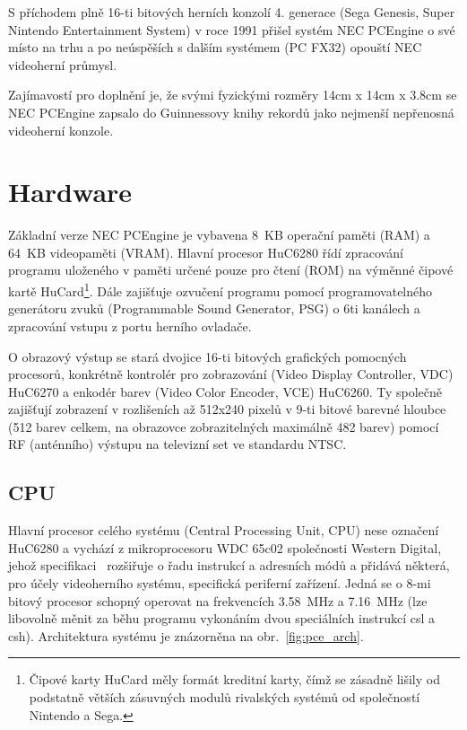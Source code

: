 S příchodem plně 16-ti bitových herních konzolí 4. generace (Sega Genesis,
Super Nintendo Entertainment System) v roce 1991 přišel systém NEC PCEngine o
své místo na trhu a po neúspěších s dalším systémem (PC FX32) opouští NEC
videoherní průmysl.~\cite{wwwWikiTurboGrafx}

Zajímavostí pro doplnění je, že svými fyzickými rozměry 14cm x 14cm x 3.8cm se
NEC PCEngine zapsalo do Guinnessovy knihy rekordů jako nejmenší nepřenosná
videoherní konzole.~\cite{Guinness08}


\section{Hardware}\label{chap:spec_hw}

Základní verze NEC PCEngine je vybavena 8~KB operační paměti (RAM) a 64~KB
videopaměti (VRAM). Hlavní procesor HuC6280 řídí zpracování programu uloženého
v paměti určené pouze pro čtení (ROM) na výměnné čipové kartě
HuCard\footnote{Čipové karty HuCard měly formát kreditní karty, čímž se zásadně
lišily od podstatně větších zásuvných modulů rivalských systémů od společností
Nintendo a Sega.}. Dále zajišťuje ozvučení programu pomocí programovatelného
generátoru zvuků (Programmable Sound Generator, PSG) o 6ti kanálech a
zpracování vstupu z portu herního ovladače.

O obrazový výstup se stará dvojice 16-ti bitových grafických pomocných
procesorů, konkrétně kontrolér pro zobrazování (Video Display Controller, VDC)
HuC6270 a enkodér barev (Video Color Encoder, VCE) HuC6260. Ty společně
zajišťují zobrazení v rozlišeních až 512x240 pixelů v 9-ti bitové barevné
hloubce (512 barev celkem, na obrazovce zobrazitelných maximálně 482 barev)
pomocí RF (anténního) výstupu na televizní set ve standardu NTSC.~\cite{wwwWikiTurboGrafx}

%
%

\subsection{CPU}\label{chap:spec_hw_cpu}

Hlavní procesor celého systému (Central Processing Unit, CPU) nese označení
HuC6280 a vychází z mikroprocesoru WDC 65c02 společnosti Western Digital, jehož
specifikaci~\cite{www65c02} rozšiřuje o řadu instrukcí a adresních módů a
přidává některá, pro účely videoherního systému, specifická periferní zařízení.
Jedná se o 8-mi bitový procesor schopný operovat na frekvencích 3.58~MHz a
7.16~MHz (lze libovolně měnit za běhu programu vykonáním dvou speciálních
instrukcí {\sc csl} a {\sc csh}). Architektura systému je znázorněna na
obr.~\ref{fig:pce_arch}.

